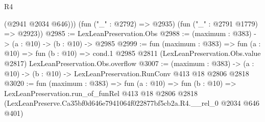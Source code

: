 \begin{lexlean}{R4}
\begin{coremodule}
          (@2941 @2034 @646)))
      (fun ("_" : @2792) => @2935)
      (fun ("_" : @2791 @1779) => @2923))
@2985 := LexLeanPreservation.Obs
@2988 := (maximum : @383) -> (a : @10) -> (b : @10) -> @2985
@2999 := fun (maximum : @383) =>
  fun (a : @10) =>
  fun (b : @10) =>
  cond.{1} @2985 @2811 (LexLeanPreservation.Obs.value @2817) LexLeanPreservation.Obs.overflow
@3007 := (maximum : @383) ->
  (a : @10) -> (b : @10) -> LexLeanPreservation.RunConv @413 @18 @2806 @2818
@3020 := fun (maximum : @383) =>
  fun (a : @10) =>
  fun (b : @10) =>
  LexLeanPreservation.run_of_funRel
    @413
    @18
    @2806
    @2818
    (LexLeanPreserve.Ca35bf0d646e7941064f022877bf5cb2a.R4.__rel_0 @2034 @646 @401)
\end{coremodule}
\end{lexlean}
